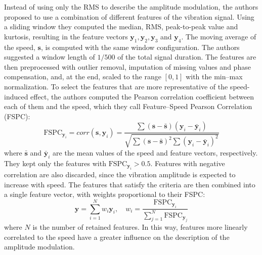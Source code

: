Instead of using only the RMS to describe the amplitude modulation, the authors proposed to use a combination of different features of the vibration signal. Using a sliding window they computed the median, RMS, peak-to-peak value and kurtosis, resulting in the feature vectors $\mathbf{y}_1, \mathbf{y}_2, \mathbf{y}_3$ and $\mathbf{y}_4$. The moving average of the speed, $\mathbf{s}$, is computed with the same window configuration. The authors suggested a window length of $1/500$ of the total signal duration. The features are then preprocessed with outlier removal, imputation of missing values and phase compensation, and, at the end, scaled to the range $[0, 1]$ with the min--max normalization. To select the features that are more representative of the speed-induced effect, the authors computed the Pearson correlation coefficient between each of them and the speed, which they call Feature--Speed Pearson Correlation (FSPC):
\begin{equation}
    \text{FSPC}_{\mathbf{y}_i} = corr(\mathbf{s}, \mathbf{y}_i) = \frac{\sum (\mathbf{s} - \bar{\mathbf{s}})(\mathbf{y}_i - \bar{\mathbf{y}}_i)}{\sqrt{\sum (\mathbf{s} - \bar{\mathbf{s}})^2 \sum (\mathbf{y}_i - \bar{\mathbf{y}}_i)^2}}
\end{equation}
where $\bar{\mathbf{s}}$ and $\bar{\mathbf{y}}_i$ are the mean values of the speed and feature vectors, respectively. They kept only the features with $\text{FSPC}_{\mathbf{y}_i} > 0.5$. Features with negative correlation are also discarded, since the vibration amplitude is expected to increase with speed. The features that satisfy the criteria are then combined into a single feature vector, with weights proportional to their FSPC:
\begin{equation}
    \mathbf{y} = \sum_{i=1}^{N} w_i \mathbf{y}_i, \quad w_i = \frac{\text{FSPC}_{\mathbf{y}_i}}{\sum_{j=1}^{N} \text{FSPC}_{\mathbf{y}_j}}
\end{equation}
where $N$ is the number of retained features. In this way, features more linearly correlated to the speed have a greater influence on the description of the amplitude modulation.

